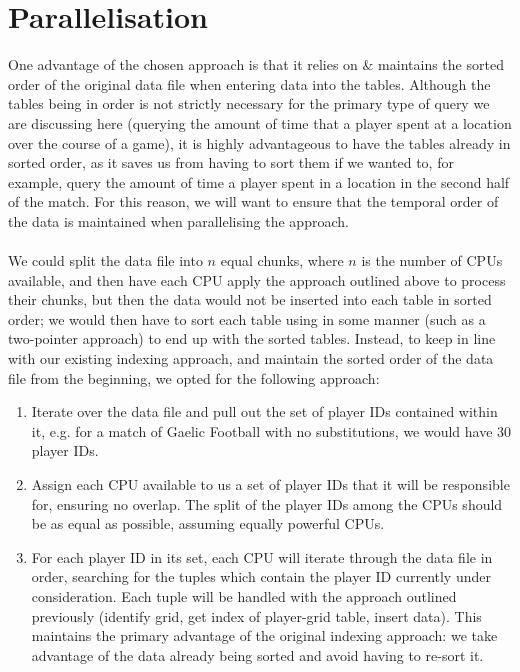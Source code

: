 \documentclass[a4paper,11pt]{article}
\begin{document}
\section{Parallelisation}
One advantage of the chosen approach is that it relies on \& maintains the sorted order of the original data file when entering data into the tables.
Although the tables being in order is not strictly necessary for the primary type of query we are discussing here (querying the amount of time that a player spent at a location over the course of a game), it is highly advantageous to have the tables already in sorted order, as it saves us from having to sort them if we wanted to, for example, query the amount of time a player spent in a location in the second half of the match.
For this reason, we will want to ensure that the temporal order of the data is maintained when parallelising the approach.
\\\\
We could split the data file into $n$ equal chunks, where $n$ is the number of CPUs available, and then have each CPU apply the approach outlined above to process their chunks, but then the data would not be inserted into each table in sorted order; we would then have to sort each table using in some manner (such as a two-pointer approach) to end up with the sorted tables.
Instead, to keep in line with our existing indexing approach, and maintain the sorted order of the data file from the beginning, we opted for the following approach:
\begin{enumerate}
    \item   Iterate over the data file and pull out the set of player IDs contained within it, e.g. for a match of Gaelic Football with no substitutions, we would have $30$ player IDs.
    \item   Assign each CPU available to us a set of player IDs that it will be responsible for, ensuring no overlap. 
            The split of the player IDs among the CPUs should be as equal as possible, assuming equally powerful CPUs.
    \item   For each player ID in its set, each CPU will iterate through the data file in order, searching for the tuples which contain the player ID currently under consideration.    
            Each tuple will be handled with the approach outlined previously (identify grid, get index of player-grid table, insert data).
            This maintains the primary advantage of the original indexing approach: we take advantage of the data already being sorted and avoid having to re-sort it.
\end{enumerate}
\end{document}
